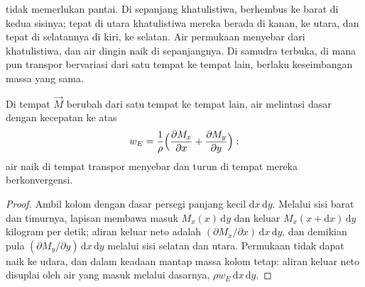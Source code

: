  tidak memerlukan pantai. Di sepanjang khatulistiwa,  berhembus ke barat di kedua sisinya; tepat di utara khatulistiwa  mereka berada di kanan, ke utara, dan tepat di selatannya di kiri, ke selatan. Air permukaan menyebar dari khatulistiwa, dan air dingin naik di sepanjangnya. Di samudra terbuka, di mana pun transpor bervariasi dari satu tempat ke tempat lain, berlaku keseimbangan massa yang sama.

\begin{proposition}\label{prop:b1:ocean-circulation:pumping}
Di tempat  $\vec M$ berubah dari satu tempat ke tempat lain, air melintasi dasar  dengan kecepatan ke atas
\[
  w_E = \frac{1}{\rho}\Bigl(\frac{\partial M_x}{\partial x} + \frac{\partial M_y}{\partial y}\Bigr):
\]
air naik di tempat transpor menyebar dan turun di tempat mereka berkonvergensi.
\end{proposition}

\begin{proof}
Ambil kolom  dengan dasar persegi panjang kecil $\mathrm dx\,\mathrm
dy$. Melalui sisi barat dan timurnya, lapisan membawa masuk $M_x(x)\,\mathrm dy$
dan keluar $M_x(x + \mathrm dx)\,\mathrm dy$ kilogram per detik; aliran keluar neto adalah
$(\partial M_x/\partial x)\,\mathrm dx\,\mathrm dy$, dan demikian pula
$(\partial M_y/\partial y)\,\mathrm dx\,\mathrm dy$ melalui sisi selatan dan utara. Permukaan tidak dapat naik ke udara, dan dalam keadaan mantap massa kolom tetap: aliran keluar neto disuplai oleh air yang masuk melalui dasarnya, $\rho w_E\,\mathrm dx\,\mathrm dy$.
\end{proof}

